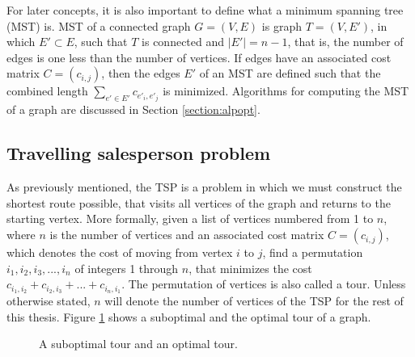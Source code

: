 \documentclass[english, 12pt, a4paper, sci, utf8, a-1b, online]{aaltothesis}
\begin{document}
For later concepts, it is also important to define what a minimum spanning tree (MST) is. MST of a connected graph $G = (V, E)$ is graph $T = (V, E')$, in which $E' \subset E$, such that $T$ is connected and $|E'| = n - 1$, that is, the number of edges is one less than the number of vertices. If edges have an associated cost matrix $C = (c_{i, j})$, then the edges $E'$ of an MST are defined such that the combined length $\sum_{e' \in E'} c_{e'_i, e'_j}$ is minimized. Algorithms for computing the MST of a graph are discussed in Section \ref{section:alpopt}.


\subsection{Travelling salesperson problem}
As previously mentioned, the TSP is a problem in which we must construct the shortest route possible, that visits all vertices of the graph and returns to the starting vertex. More formally, given a list of vertices numbered from 1 to $n$, where $n$ is the number of vertices and an associated cost matrix $C = (c_{i, j})$, which denotes the cost of moving from vertex $i$ to $j$, find a permutation $i_1, i_2, i_3, ..., i_n$ of integers 1 through $n$, that minimizes the cost $c_{i_1, i_2} + c_{i_2, i_3} + ... + c_{i_n, i_1}$. The permutation of vertices is also called a tour. Unless otherwise stated, $n$ will denote the number of vertices of the TSP for the rest of this thesis. Figure \ref{fig:tsp} shows a suboptimal and the optimal tour of a graph.

\begin{figure}[H]
\centering
{}
\caption{A suboptimal tour and an optimal tour.} \label{fig:tsp}
\end{figure}
\end{document}
